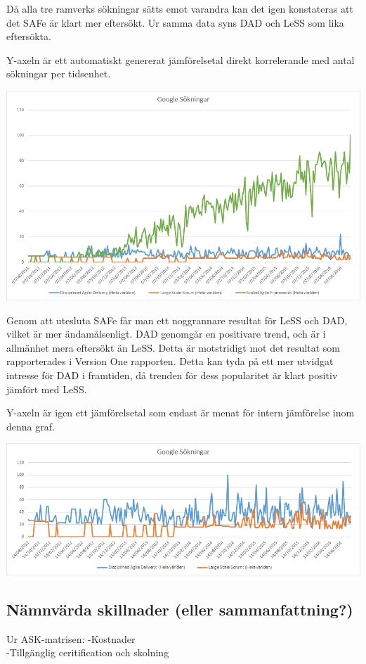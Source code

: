 		Då alla tre ramverks sökningar sätts emot varandra kan det igen konstateras att det SAFe är klart mer eftersökt. Ur samma data syns DAD och LeSS som lika eftersökta.
		
		Y-axeln är ett automatiskt genererat jämförelsetal direkt korrelerande med antal sökningar per tidsenhet.
		\begin{center}
			\includegraphics{Grafer/Google_sokningar.png}
		\end{center}
		\cite{google_stats}
	
	
		Genom att utesluta SAFe får man ett noggrannare resultat för LeSS och DAD, vilket är mer ändamålsenligt. DAD genomgår en positivare trend, och är i allmänhet mera eftersökt än LeSS. Detta är motstridigt mot det resultat som rapporterades i Version One rapporten. Detta kan tyda på ett mer utvidgat intresse för DAD i framtiden, då trenden för dess popularitet är klart positiv jämfört med LeSS.
	
		Y-axeln är igen ett jämförelsetal som endast är menat för intern jämförelse inom denna graf.
		\begin{center}
			\includegraphics{Grafer/Google_sokningar_dad_less.png}
		\end{center}
		\cite{google_stats_dad_less}
		
		
	\subsection{Nämnvärda skillnader (eller sammanfattning?)}
		Ur ASK-matrisen:
		-Kostnader \\
		-Tillgänglig ceritification och skolning
				
	